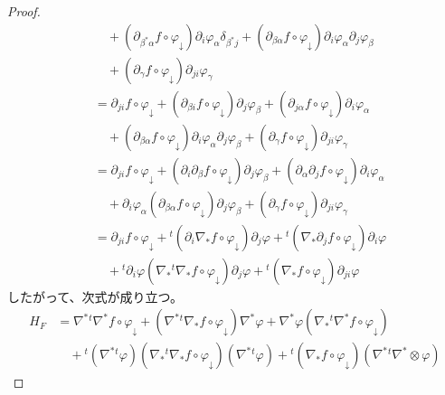 \documentclass[dvipdfmx]{jsarticle}
\begin{document}
\begin{proof}
\begin{align*}
&\quad + \left( \partial_{\beta^{*}\alpha}f \circ \varphi_{\downarrow} \right)\partial_{i}\varphi_{\alpha}\delta_{\beta^{*}j} + \left( \partial_{\beta\alpha}f \circ \varphi_{\downarrow} \right)\partial_{i}\varphi_{\alpha}\partial_{j}\varphi_{\beta} \\
&\quad + \left( \partial_{\gamma}f \circ \varphi_{\downarrow} \right)\partial_{ji}\varphi_{\gamma}\\
&= \partial_{ji}f \circ \varphi_{\downarrow} + \left( \partial_{\beta i}f \circ \varphi_{\downarrow} \right)\partial_{j}\varphi_{\beta} + \left( \partial_{j\alpha}f \circ \varphi_{\downarrow} \right)\partial_{i}\varphi_{\alpha} \\
&\quad + \left( \partial_{\beta\alpha}f \circ \varphi_{\downarrow} \right)\partial_{i}\varphi_{\alpha}\partial_{j}\varphi_{\beta} + \left( \partial_{\gamma}f \circ \varphi_{\downarrow} \right)\partial_{ji}\varphi_{\gamma}\\
&= \partial_{ji}f \circ \varphi_{\downarrow} + \left( \partial_{i}\partial_{\beta}f \circ \varphi_{\downarrow} \right)\partial_{j}\varphi_{\beta} + \left( \partial_{\alpha}\partial_{j}f \circ \varphi_{\downarrow} \right)\partial_{i}\varphi_{\alpha} \\
&\quad + \partial_{i}\varphi_{\alpha}\left( \partial_{\beta\alpha}f \circ \varphi_{\downarrow} \right)\partial_{j}\varphi_{\beta} + \left( \partial_{\gamma}f \circ \varphi_{\downarrow} \right)\partial_{ji}\varphi_{\gamma}\\
&= \partial_{ji}f \circ \varphi_{\downarrow} +{}^t \left( \partial_{i}\nabla_{*}f \circ \varphi_{\downarrow} \right)\partial_{j}\varphi +{}^t \left( \nabla_{*}\partial_{j}f \circ \varphi_{\downarrow} \right)\partial_{i}\varphi \\
&\quad +{}^t \partial_{i}\varphi\left( \nabla_{*}{}^t \nabla_{*}f \circ \varphi_{\downarrow} \right)\partial_{j}\varphi +{}^t \left( \nabla_{*}f \circ \varphi_{\downarrow} \right)\partial_{ji}\varphi
\end{align*}
したがって、次式が成り立つ。
\begin{align*}
H_{F} &= \nabla^{*}{}^t \nabla^{*}f \circ \varphi_{\downarrow} + \left( \nabla^{*}{}^t \nabla_{*}f \circ \varphi_{\downarrow} \right)\nabla^{*}\varphi + \nabla^{*}\varphi\left( \nabla_{*}{}^t \nabla^{*}f \circ \varphi_{\downarrow} \right) \\
&\quad +{}^t \left( \nabla^{*}{}^t \varphi \right)\left( \nabla_{*}{}^t \nabla_{*}f \circ \varphi_{\downarrow} \right)\left( \nabla^{*}{}^t \varphi \right) +{}^t \left( \nabla_{*}f \circ \varphi_{\downarrow} \right)\left( \nabla^{*}{}^t \nabla^{*} \otimes \varphi \right)
\end{align*}
\end{proof}\par
\end{document}
